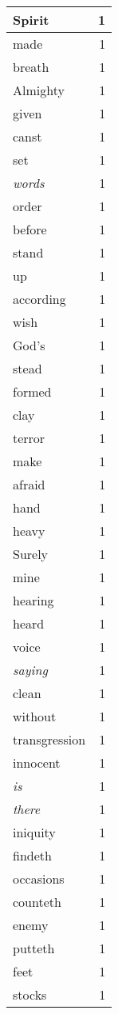 \begin{center}
\begin{longtable}{l|r}
Spirit & 1 \\ \hline
made & 1 \\ \hline
breath & 1 \\ \hline
Almighty & 1 \\ \hline
given & 1 \\ \hline
canst & 1 \\ \hline
set & 1 \\ \hline
\emph{words} & 1 \\ \hline
order & 1 \\ \hline
before & 1 \\ \hline
stand & 1 \\ \hline
up & 1 \\ \hline
according & 1 \\ \hline
wish & 1 \\ \hline
God's & 1 \\ \hline
stead & 1 \\ \hline
formed & 1 \\ \hline
clay & 1 \\ \hline
terror & 1 \\ \hline
make & 1 \\ \hline
afraid & 1 \\ \hline
hand & 1 \\ \hline
heavy & 1 \\ \hline
Surely & 1 \\ \hline
mine & 1 \\ \hline
hearing & 1 \\ \hline
heard & 1 \\ \hline
voice & 1 \\ \hline
\emph{saying} & 1 \\ \hline
clean & 1 \\ \hline
without & 1 \\ \hline
transgression & 1 \\ \hline
innocent & 1 \\ \hline
\emph{is} & 1 \\ \hline
\emph{there} & 1 \\ \hline
iniquity & 1 \\ \hline
findeth & 1 \\ \hline
occasions & 1 \\ \hline
counteth & 1 \\ \hline
enemy & 1 \\ \hline
putteth & 1 \\ \hline
feet & 1 \\ \hline
stocks & 1 \\ \hline

\end{longtable}
\end{center}
